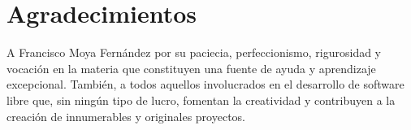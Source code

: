



\chapter*{Agradecimientos}

\thispagestyle{empty} 				%


A Francisco Moya Fernández por su paciecia, perfeccionismo, rigurosidad y vocación en la materia que constituyen una fuente de ayuda y aprendizaje excepcional. También, a todos aquellos involucrados en el desarrollo de software libre que, sin ningún tipo de lucro, fomentan la creatividad y contribuyen a la creación de innumerables y originales proyectos.

\cleardoublepage
